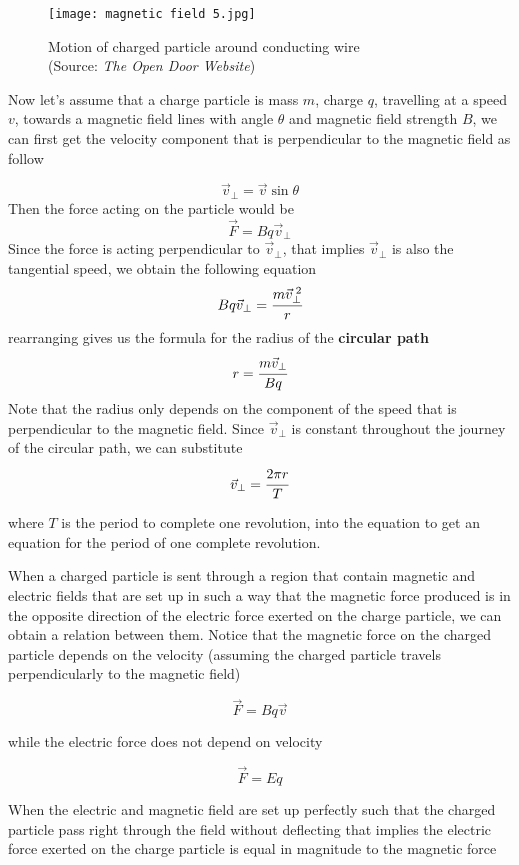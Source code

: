 \documentclass{article}
\begin{document}
\begin{figure}[H]
    \centering
    \captionsetup{justification=centering,margin=2cm}
    \texttt{[image: magnetic field 5.jpg]}
    \caption*{Motion of charged particle around conducting wire \\ (Source: \textit{The Open Door Website})}
\end{figure}

Now let's assume that a charge particle is mass $m$, charge $q$, travelling at a speed $v$, towards a magnetic field lines with angle $\theta$ and magnetic field strength $B$, we can first get the velocity component that is perpendicular to the magnetic field as follow

$$\vec{v}_{\perp}=\vec{v}\sin \theta$$
Then the force acting on the particle would be 
$$\vec{F}=Bq\vec{v}_{\perp}$$
Since the force is acting perpendicular to $\vec{v}_{\perp}$, that implies $\vec{v}_{\perp}$ is also the tangential speed, we obtain the following equation
$$Bq\vec{v}_{\perp}=\cfrac{m\vec{v}_{\perp}^{\;2}}{r}$$
rearranging gives us the formula for the radius of the \textbf{circular path}
$$r=\cfrac{m\vec{v}_{\perp}}{Bq}$$
Note that the radius only depends on the component of the speed that is perpendicular to the magnetic field. Since $\vec{v}_{\perp}$ is constant throughout the journey of the circular path, we can substitute 
$$\vec{v}_{\perp}=\cfrac{2\pi r}{T}$$

where $T$ is the period to complete one revolution, into the equation to get an equation for the period of one complete revolution.

When a charged particle is sent through a region that contain magnetic and electric fields that are set up in such a way that the magnetic force produced is in the opposite direction of the electric force exerted on the charge particle, we can obtain a relation between them. Notice that the magnetic force on the charged particle depends on the velocity (assuming the charged particle travels perpendicularly to the magnetic field)

$$\vec{F}=Bq\vec{v}$$

while the electric force does not depend on velocity

$$\vec{F}=Eq$$

When the electric and magnetic field are set up perfectly such that the charged particle pass right through the field without deflecting that implies the electric force exerted on the charge particle is equal in magnitude to the magnetic force
\end{document}
